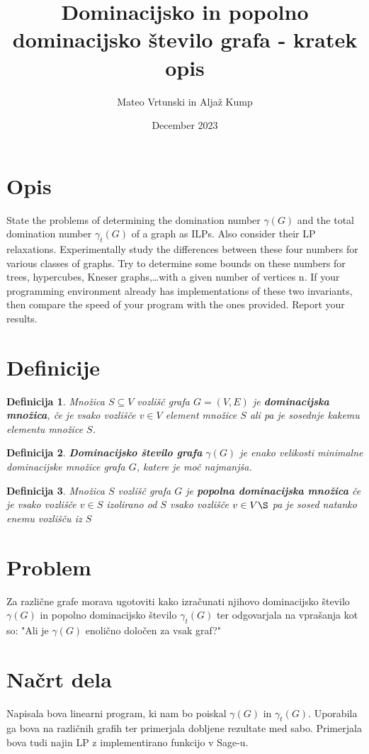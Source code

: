 \documentclass[a4paper,12pt]{article}
\newtheorem{definition}{Definicija}
\begin{document}
\author{Mateo Vrtunski in Aljaž Kump}
\date{December 2023}
\title{Dominacijsko in popolno dominacijsko število grafa - kratek opis}
\maketitle

\section{Opis}

State the problems of determining the domination number $\gamma (G)$ and the total domination number $\gamma_t (G)$ of a graph as ILPs. Also consider their LP relaxations.
Experimentally study the differences between these four numbers for various classes of graphs.
Try to determine some bounds on these numbers for trees, hypercubes, Kneser graphs,\ldots  with
a given number of vertices n. If your programming environment already has implementations of
these two invariants, then compare the speed of your program with the ones provided. Report your results.

\section{Definicije}

    \begin{definition}
       Množica $S\subseteq V$ vozlišč grafa $G = (V,E)$ je \textbf{dominacijska množica}, če je vsako vozlišče $v \in  V$ element množice $S$ ali pa je sosednje kakemu elementu množice $S$.
    \end{definition}

    \begin{definition}
        \textbf{Dominacijsko število grafa} $\gamma(G)$ je enako velikosti minimalne dominacijske množice grafa $G$, katere je moč najmanjša. 
    \end{definition}

    \begin{definition}
        Množica $S$ vozlišč grafa $G$ je \textbf{popolna dominacijska množica} če je vsako vozlišče $v \in  S$ izolirano od $S$ vsako vozlišče $v \in V\S$ pa je sosed natanko enemu vozlišču iz $S$
    \end{definition}
\pagebreak

\section{Problem} 
    Za različne grafe morava ugotoviti kako izračunati njihovo dominacijsko število $\gamma(G)$ in popolno dominacijsko število  $\gamma_t (G)$ ter odgovarjala na vprašanja kot so:  "Ali je $\gamma(G)$ enolično določen za vsak graf?"
    
\section{Načrt dela}
    Napisala bova linearni program, ki nam bo poiskal $\gamma(G)$ in $\gamma_t (G)$. Uporabila ga bova na različnih grafih ter primerjala dobljene rezultate med sabo. 
    Primerjala bova tudi najin LP z implementirano funkcijo v Sage-u.
\end{document}
